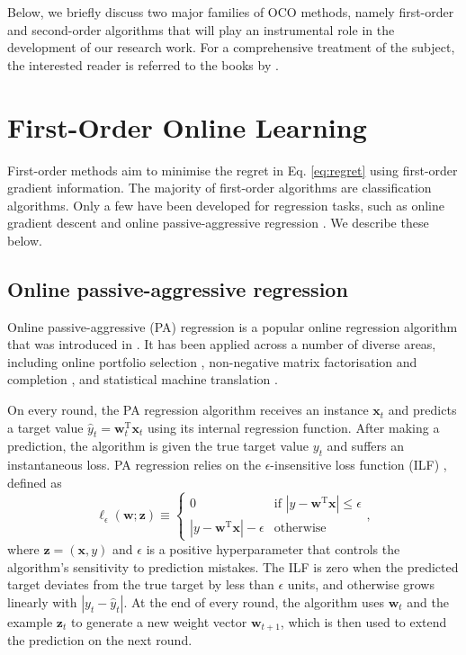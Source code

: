Below, we briefly discuss two major families of OCO methods, namely first-order and second-order algorithms that will play an instrumental role in the development of our research work. For a comprehensive treatment of the subject, the interested reader is referred to the books by \citet{shalev-shwartz11, oco}.

\section{First-Order Online Learning}

\begin{mccorrection}
First-order methods aim to minimise the regret in Eq. \eqref{eq:regret} using first-order gradient information. The majority of first-order algorithms are classification algorithms. Only a few have been developed for regression tasks, such as online gradient descent \citep{ogd} and online passive-aggressive regression \citep{crammer06}. We describe these below.
\end{mccorrection}

\subsection{Online passive-aggressive regression}

Online passive-aggressive (PA) regression is a popular online regression algorithm that was introduced in \citep{crammer06}. It has been applied across a number of diverse areas, including online portfolio selection \citep{pamr}, non-negative matrix factorisation and completion \citep{blondel14}, and statistical machine translation \citep{turchi}.

On every round, the PA regression algorithm receives an instance $\mathbf{x}_t$ and predicts a target value $\hat{y}_t = \mathbf{w}_{t}^\text{T}\mathbf{x}_t$ using its internal regression function. After making a prediction, the algorithm is given
the true target value $y_t$ and suffers an instantaneous loss. PA regression relies on the $\epsilon$-insensitive loss function (ILF) \citep{vapnik98}, defined as
\begin{equation}
\label{eq:ilf}
	 \ell_{\epsilon}(\mathbf{w}; \mathbf{z}) \equiv
	 \begin{cases}
	 	0 & \text{if } |y - \mathbf{w}^\text{T}\mathbf{x}| \leq \epsilon \\
	 	|y - \mathbf{w}^\text{T}\mathbf{x}| - \epsilon & \text{otherwise}
	 \end{cases},
\end{equation}
where $\mathbf{z} = (\mathbf{x}, y)$ and $\epsilon$ is a positive hyperparameter that controls the algorithm's sensitivity to prediction mistakes. The ILF is zero when the predicted target deviates from the true target by less than $\epsilon$ units, and otherwise grows linearly with $|y_t - \hat{y}_t|$. At the end of every round, the algorithm uses $\mathbf{w}_t$ and the example $\mathbf{z}_t$ to generate a new weight vector $\mathbf{w}_{t+1}$, which is then used to extend the prediction on the next round.

